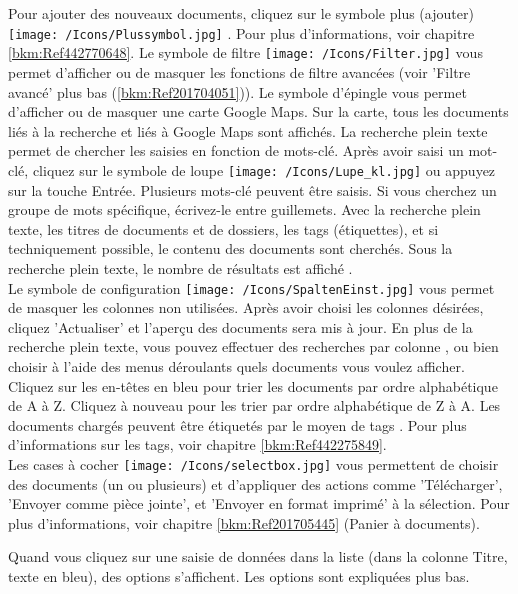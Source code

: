 Pour ajouter des nouveaux documents, cliquez sur le symbole plus (ajouter) \texttt{[image: /Icons/Plussymbol.jpg]} . Pour plus d'informations, voir chapitre \ref{bkm:Ref442770648}. Le symbole de filtre \texttt{[image: /Icons/Filter.jpg]}  vous permet d'afficher ou de masquer les fonctions de filtre avancées (voir 'Filtre avancé' plus bas (\ref{bkm:Ref201704051})). Le symbole d'épingle  vous permet d'afficher ou de masquer une carte Google Maps. Sur la carte, tous les documents liés à la recherche et liés à Google Maps sont affichés. La recherche plein texte  permet de chercher les saisies en fonction de mots-clé. Après avoir saisi un mot-clé, cliquez sur le symbole de loupe \texttt{[image: /Icons/Lupe\_kl.jpg]}  ou appuyez sur la touche Entrée. Plusieurs mots-clé peuvent être saisis. Si vous cherchez un groupe de mots spécifique, écrivez-le entre guillemets. Avec la recherche plein texte, les titres de documents et de dossiers, les tags (étiquettes), et si techniquement possible, le contenu des documents sont cherchés. Sous la recherche plein texte, le nombre de résultats est affiché .\\
Le symbole de configuration \texttt{[image: /Icons/SpaltenEinst.jpg]}  vous permet de masquer les colonnes non utilisées. Après avoir choisi les colonnes désirées, cliquez 'Actualiser' et l'aperçu des documents sera mis à jour. \newline
\newline
En plus de la recherche plein texte, vous pouvez effectuer des recherches par colonne , ou bien choisir à l'aide des menus déroulants quels documents vous voulez afficher. Cliquez sur les en-têtes en bleu pour trier les documents par ordre alphabétique de A à Z. Cliquez à nouveau pour les trier par ordre alphabétique de Z à A. \newline
Les documents chargés peuvent être étiquetés par le moyen de tags . Pour plus d'informations sur les tags, voir chapitre \ref{bkm:Ref442275849}. \\
Les cases à cocher \texttt{[image: /Icons/selectbox.jpg]}  vous permettent de choisir des documents (un ou plusieurs) et d'appliquer des actions comme 'Télécharger', 'Envoyer comme pièce jointe', et 'Envoyer en format imprimé' à la sélection. Pour plus d'informations, voir chapitre \ref{bkm:Ref201705445} (Panier à documents).

Quand vous cliquez sur une saisie de données dans la liste  (dans la colonne Titre, texte en bleu), des options s'affichent. Les options sont expliquées plus bas.

